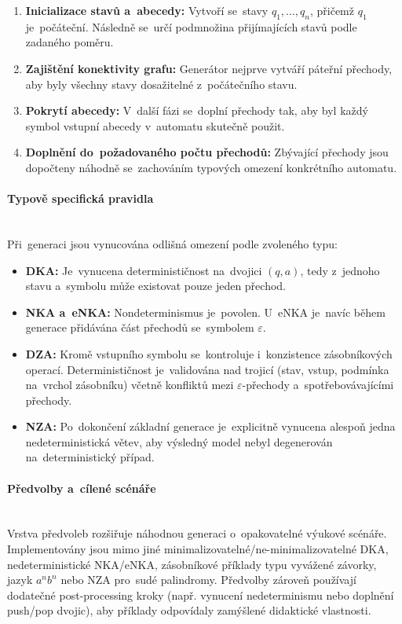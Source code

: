\documentclass[
  master,
  program=ainfvs,
  printversion,
  figures=false,
  tables=false,
  glossaries,
  index
]{kidiplom}
\begin{document}
\begin{enumerate}
    \item \textbf{Inicializace stavů a~abecedy:} Vytvoří se~stavy $q_1,\dots,q_n$, přičemž $q_1$ je~počáteční. Následně se~určí podmnožina přijímajících stavů podle zadaného poměru.
    \item \textbf{Zajištění konektivity grafu:} Generátor nejprve vytváří páteřní přechody, aby byly všechny stavy dosažitelné z~počátečního stavu.
    \item \textbf{Pokrytí abecedy:} V~další fázi se~doplní přechody tak, aby byl každý symbol vstupní abecedy v~automatu skutečně použit.
    \item \textbf{Doplnění do~požadovaného počtu přechodů:} Zbývající přechody jsou dopočteny náhodně se~zachováním typových omezení konkrétního automatu.
\end{enumerate}

\paragraph{Typově specifická pravidla} \mbox{} \\
Při~generaci jsou vynucována odlišná omezení podle zvoleného typu:

\begin{itemize}
    \item \textbf{\gls{DKA}:} Je~vynucena determinističnost na~dvojici $(q, a)$, tedy z~jednoho stavu a~symbolu může existovat pouze jeden přechod.
    \item \textbf{\gls{NKA} a~\gls{eNKA}:} Nondeterminismus je~povolen. U~\gls{eNKA} je~navíc během generace přidávána část přechodů se~symbolem $\varepsilon$.
    \item \textbf{\gls{DZA}:} Kromě vstupního symbolu se~kontroluje i~konzistence zásobníkových operací. Determinističnost je~validována nad trojicí (stav, vstup, podmínka na~vrchol zásobníku) včetně konfliktů mezi $\varepsilon$-přechody a~spotřebovávajícími přechody.
    \item \textbf{\gls{NZA}:} Po~dokončení základní generace je~explicitně vynucena alespoň jedna nedeterministická větev, aby výsledný model nebyl degenerován na~deterministický případ.
\end{itemize}

\paragraph{Předvolby a~cílené scénáře} \mbox{} \\
Vrstva předvoleb rozšiřuje náhodnou generaci o~opakovatelné výukové scénáře. Implementovány jsou mimo jiné minimalizovatelné/ne-minimalizovatelné \gls{DKA}, nedeterministické \gls{NKA}/\gls{eNKA}, zásobníkové příklady typu vyvážené závorky, jazyk $a^n b^n$ nebo \gls{NZA} pro~sudé palindromy. Předvolby zároveň používají dodatečné post-processing kroky (např. vynucení nedeterminismu nebo doplnění push/pop dvojic), aby příklady odpovídaly zamýšlené didaktické vlastnosti.
\end{document}
